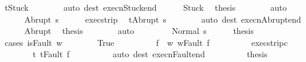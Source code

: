 \begin{isabellebody}
\ {\isachardoublequoteopen}t{\isacharequal}Stuck{\isachardoublequoteclose}\isanewline
\ \ \ \ \ \ \isamarkupfalse%
\ {\isacharparenleft}auto\ dest{\isacharcolon}\ execn{\isacharunderscore}Stuck{\isacharunderscore}end{\isacharparenright}\isanewline
\ \ \ \ \isamarkupfalse%
\ Stuck\ \isamarkupfalse%
\ {\isacharquery}thesis\isanewline
\ \ \ \ \ \ \isamarkupfalse%
\ auto\isanewline
\ \ \isamarkupfalse%
\isanewline
\ \ \ \ \isamarkupfalse%
\ {\isacharparenleft}Abrupt\ s{\isacharprime}{\isacharparenright}\isanewline
\ \ \ \ \isamarkupfalse%
\ exec{\isacharunderscore}strip\ \isamarkupfalse%
\ {\isachardoublequoteopen}t{\isacharequal}Abrupt\ s{\isacharprime}{\isachardoublequoteclose}\isanewline
\ \ \ \ \ \ \isamarkupfalse%
\ {\isacharparenleft}auto\ dest{\isacharcolon}\ execn{\isacharunderscore}Abrupt{\isacharunderscore}end{\isacharparenright}\isanewline
\ \ \ \ \isamarkupfalse%
\ Abrupt\ \isamarkupfalse%
\ {\isacharquery}thesis\isanewline
\ \ \ \ \ \ \isamarkupfalse%
\ auto\isanewline
\ \ \isamarkupfalse%
\isanewline
\ \ \ \ \isamarkupfalse%
\ {\isacharparenleft}Normal\ s{\isacharprime}{\isacharparenright}\isanewline
\ \ \ \ \isamarkupfalse%
\ {\isacharquery}thesis\isanewline
\ \ \ \ \isamarkupfalse%
\ {\isacharparenleft}cases\ {\isachardoublequoteopen}isFault\ w{\isachardoublequoteclose}{\isacharparenright}\isanewline
\ \ \ \ \ \ \isamarkupfalse%
\ True\isanewline
\ \ \ \ \ \ \isamarkupfalse%
\ \isamarkupfalse%
\ f\ \ w{\isacharprime}{\isacharcolon}\ {\isachardoublequoteopen}w{\isacharequal}Fault\ f{\isachardoublequoteclose}\isacommand{{\isachardot}{\isachardot}}\isamarkupfalse%
\isanewline
\ \ \ \ \ \ \isamarkupfalse%
\ \isamarkupfalse%
\ exec{\isacharunderscore}strip{\isacharunderscore}c{}\ \isanewline
\ \ \ \ \ \ \isamarkupfalse%
\ t{\isacharcolon}\ {\isachardoublequoteopen}t{\isacharequal}Fault\ f{\isachardoublequoteclose}\isanewline
\ \ \ \ \ \ \ \ \isamarkupfalse%
\ {\isacharparenleft}auto\ dest{\isacharcolon}\ execn{\isacharunderscore}Fault{\isacharunderscore}end{\isacharparenright}\isanewline
\ \ \ \ \ \ \isamarkupfalse%
\ \isamarkupfalse%
\ {\isacharquery}thesis\isanewline
\ \ \ \ \ \ \ \ \isamarkupfalse%

\end{isabellebody}
